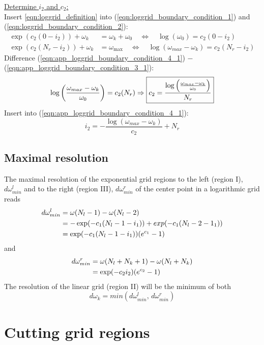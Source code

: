 \newpage
\vspace{1cm}
\noindent\underline{Determine $i_2$ and $c_2$:}\\

\noindent Insert \ref{eqn:loggrid_definition} into (\ref{eqn:loggrid_boundary_condition_1}) and (\ref{eqn:loggrid_boundary_condition_2}):
\begin{align}
	\exp(c_2(0-i_2))+\omega_k&=\omega_k+\omega_0 \quad \Leftrightarrow \quad \log(\omega_0)=c_2 (0-i_2) \label{eqn:app_loggrid_boundary_condition_3_1}\\
	\exp(c_2(N_r-i_2))+\omega_k&=\omega_{\max} \quad \Leftrightarrow \quad \log(\omega_{max}-\omega_k)=c_2(N_r-i_2) \label{eqn:app_loggrid_boundary_condition_4_1}
\end{align}
Difference (\ref{eqn:app_loggrid_boundary_condition_4_1}) $-$ (\ref{eqn:app_loggrid_boundary_condition_3_1}):
\[
	\log\left(\frac{\omega_{max}-\omega_k}{\omega_0}\right)=c_2 (N_r)\\\Rightarrow \boxed{c_2=\frac{\log\left(\frac{\omega_{max}-\omega_k}{\omega_0}\right)}{N_r}}
\]
Insert into (\ref{eqn:app_loggrid_boundary_condition_4_1}):
\[
	\boxed{i_2=-\frac{\log(\omega_{max}-\omega_k)}{c_2} + N_r}
\]
\section{Maximal resolution}
\label{sec:app_loggrid_max_resolution}
The maximal resolution of the exponential grid regions to the left (region I), $d\omega_{min}^{l}$ and to the right (region III), $d\omega_{min}^{r}$ of the center point in a logarithmic grid reads
\begin{align*}
	d\omega_{min}^{l} & = \omega(N_l-1)-\omega(N_l-2) \notag \\
	& = -\exp(-c_1(N_l-1-i_1))+exp(-c_1(N_l-2-1_1)) \notag \\
	& = \exp(-c_1(N_l-1-i_1))(e^{c_1}-1)
\end{align*}
and
\begin{align*}
	d\omega_{min}^{r} & = \omega(N_l+N_k+1)-\omega(N_l+N_k) \notag \\
	& = \exp(-c_2 i_2)(e^{c_2}-1)
\end{align*}
The resolution of the linear grid (region II) will be the minimum of both
\[
	d\omega_k = min( d\omega_{min}^{l} ,\,d\omega_{min}^{r})
\]
\chapter{Cutting grid regions}\label{chapter:app_cutting}
